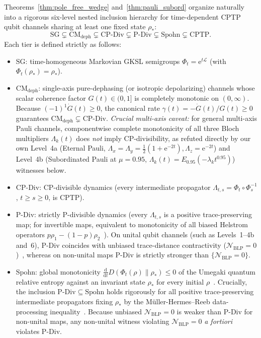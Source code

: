 \documentclass[twocolumn,10pt,amsmath,amssymb,floatfix]{revtex4-2}
\theoremstyle{plain}
\theoremstyle{definition}
\newcommand{\dd}{\mathrm{d}}
\newcommand{\ee}{\mathrm{e}}
\newcommand{\NBLP}{\mathcal{N}_{\mathrm{BLP}}}
\begin{document}
Theorems~\ref{thm:pole_free_wedge} and~\ref{thm:pauli_subord} organize naturally into a rigorous six-level nested inclusion hierarchy for time-dependent CPTP qubit channels sharing at least one fixed state $\rho_*$:
\begin{equation}
\label{eq:hierarchy}
\mathrm{SG} \subsetneq \mathrm{CM}_{\mathrm{deph}} \subsetneq \mathrm{CP\text{-}Div} \subsetneq \mathrm{P\text{-}Div} \subsetneq \mathrm{Spohn} \subsetneq \mathrm{CPTP}.
\end{equation}
Each tier is defined strictly as follows:
\begin{itemize}[leftmargin=1.4em,itemsep=1pt]
\item $\mathrm{SG}$: time-homogeneous Markovian GKSL semigroups $\Phi_t = \ee^{t\mathcal{L}}$ (with $\Phi_t(\rho_*) = \rho_*$).
\item $\mathrm{CM}_{\mathrm{deph}}$: single-axis pure-dephasing (or isotropic depolarizing) channels whose scalar coherence factor $G(t) \in (0,1]$ is completely monotonic on $(0,\infty)$. Because $(-1)^1 \dot{G}(t) \ge 0$, the canonical rate $\gamma(t) = -\dot{G}(t)/G(t) \ge 0$ guarantees $\mathrm{CM}_{\mathrm{deph}} \subsetneq \mathrm{CP\text{-}Div}$. \emph{Crucial multi-axis caveat:} for general multi-axis Pauli channels, componentwise complete monotonicity of all three Bloch multipliers $\Lambda_k(t)$ does \emph{not} imply CP-divisibility, as refuted directly by our own Level~4a (Eternal Pauli, $\Lambda_x=\Lambda_y=\frac{1}{2}(1+\ee^{-2t}), \Lambda_z=\ee^{-2t}$) and Level~4b (Subordinated Pauli at $\mu=0.95$, $\Lambda_k(t) = E_{0.95}(-\lambda_k t^{0.95})$) witnesses below.
\item $\mathrm{CP\text{-}Div}$: CP-divisible dynamics (every intermediate propagator $\Lambda_{t,s} = \Phi_t \circ \Phi_s^{-1}$, $t \ge s \ge 0$, is CPTP).
\item $\mathrm{P\text{-}Div}$: strictly P-divisible dynamics (every $\Lambda_{t,s}$ is a positive trace-preserving map; for invertible maps, equivalent to monotonicity of all biased Helstrom operators $p\rho_1 - (1-p)\rho_2$~\cite{Wissmann2015PRA,Bae2016PRL}). On unital qubit channels (such as Levels~1--4b and~6), $\mathrm{P\text{-}Div}$ coincides with unbiased trace-distance contractivity ($\NBLP = 0$)~\cite{Chruscinski2014PRL}, whereas on non-unital maps $\mathrm{P\text{-}Div}$ is strictly stronger than $\{\NBLP = 0\}$.
\item $\mathrm{Spohn}$: global monotonicity $\frac{\dd}{\dd t} D(\Phi_t(\rho)\parallel\rho_*) \le 0$ of the Umegaki quantum relative entropy against an invariant state $\rho_*$ for every initial $\rho$~\cite{Spohn1978JMP}. Crucially, the inclusion $\mathrm{P\text{-}Div} \subseteq \mathrm{Spohn}$ holds rigorously for all positive trace-preserving intermediate propagators fixing $\rho_*$ by the M\"uller-Hermes--Reeb data-processing inequality~\cite{MullerHermes2017AHP}. Because unbiased $\NBLP = 0$ is weaker than $\mathrm{P\text{-}Div}$ for non-unital maps, any non-unital witness violating $\NBLP = 0$ \emph{a fortiori} violates $\mathrm{P\text{-}Div}$.
\end{itemize}
\end{document}
